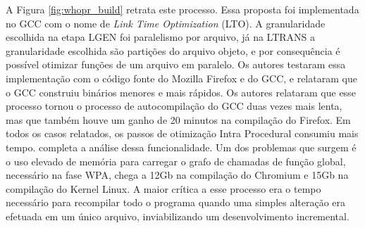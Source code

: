 A Figura \ref{fig:whopr_build} retrata este processo. Essa proposta foi implementada
no GCC \citep{glek2010optimizing} com o nome de
\textit{Link Time Optimization} (LTO). A granularidade
escolhida na etapa LGEN foi paralelismo por arquivo, já na LTRANS a granularidade
escolhida são partições do arquivo objeto, e por consequência é possível otimizar
funções de um arquivo em paralelo. Os autores testaram essa implementação com o
código fonte do Mozilla Firefox e do GCC, e relataram que o GCC construiu
binários menores e mais rápidos. Os autores relataram que esse processo tornou
o processo de autocompilação do GCC duas vezes mais lenta,
mas que também houve um ganho de 20 minutos na compilação do Firefox. Em todos os
casos relatados, os passos de otimização Intra Procedural consumiu mais tempo.
\cite{livska2014optimizing} completa a análise dessa funcionalidade.
Um dos problemas que surgem é o uso elevado de memória para carregar o grafo de
chamadas de função global, necessário na fase WPA, chega a 12Gb na compilação do
Chromium e 15Gb na compilação do Kernel Linux. A maior crítica a esse processo
era o tempo necessário para recompilar todo o programa quando uma simples alteração
era efetuada em um único arquivo, inviabilizando um desenvolvimento incremental.

